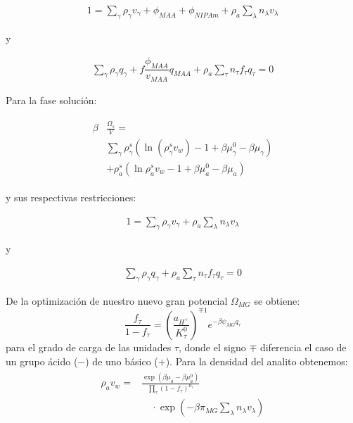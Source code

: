 \begin{align}
	1 = \sum_{\gamma } \rho_\gamma v_\gamma  + \phi_{MAA} + \phi_{NIPAm} + \rho_a \sum_\lambda n_\lambda v_\lambda
	\label{eq:gel:packing-g-total}
\end{align}

y 

\begin{align}
	\sum_{\gamma } {\rho_\gamma q_\gamma + f\dfrac{\phi_{MAA}}{v_{MAA}}q_{MAA}} + \rho_a \sum_\tau n_\tau f_\tau q_\tau = 0
\end{align}

Para la fase soluci\'on:

\begin{align}
	\begin{aligned}
		\beta&\frac{\Omega_s}{V}=\\& \sum_{\gamma   } {\rho^s_\gamma\left(\ln(\rho_\gamma^sv_w) -1 + \beta\mu_\gamma^0 - \beta\mu_\gamma\right)} \\
		& + \rho^s_a \left( \ln \rho^s_a v_w -1 +\beta\mu^0_a - \beta\mu_a\right)
	\end{aligned}
	\label{eq:gel:bulk-total}
\end{align}

y sus respectivas restricciones:

\begin{align}
	1 = \sum_{\gamma } \rho_\gamma v_\gamma  + \rho_a \sum_\lambda n_\lambda v_\lambda
\end{align}

y 

\begin{align}
	\sum_\gamma \rho_\gamma q_\gamma + \rho_a \sum_\tau n_\tau f_\tau q_\tau = 0
\end{align}



De la optimizaci\'on de nuestro nuevo gran potencial $\Omega_{MG}$  se obtiene:
%
\begin{equation}
\frac{f_\tau}{1-f_\tau}=\left(\frac{a_{H^+}}{K^0_\tau}\right)^{\mp 1} e^{-\beta \psi_{MG} q_\tau}
\label{eq:f_ads}
\end{equation}
%
\noindent para el grado de carga de las unidades $\tau$, donde el signo $\mp$ diferencia el caso de un grupo \'acido ($-$) de uno b\'asico ($+$).
Para la densidad del analito obtenemos:
%
\begin{align}
    \begin{aligned}
   \rho_a v_w =&\frac{ \exp{\left(\beta \mu_a - \beta \mu^0_a \right)}}{\prod_\tau \left(1-f_\tau\right)^{n_\tau}}\\
&\quad \cdot\exp{\left(-\beta \pi_{MG} \sum_\lambda n_\lambda v_\lambda \right)} 
    \end{aligned}\label{eq:rho_ads}
\end{align}
%

